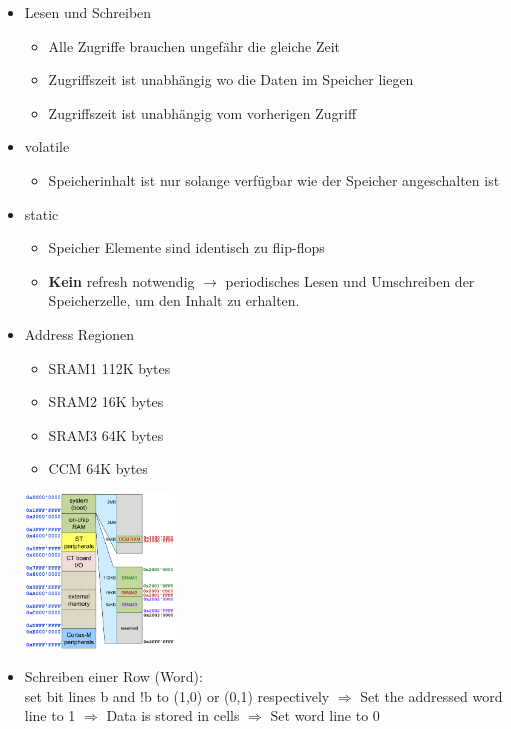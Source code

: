 \documentclass{article}
\newenvironment{Figure}
	{\par\medskip\noindent\minipage{\linewidth}}
	{\endminipage\par\medskip}
\begin{document}
\begin{itemize}
	\item{Lesen und Schreiben\\
	\begin{itemize}
		\item Alle Zugriffe brauchen ungefähr die gleiche Zeit
		\item Zugriffszeit ist unabhängig wo die Daten im Speicher liegen
		\item Zugriffszeit ist unabhängig vom vorherigen Zugriff
	\end{itemize}
	}
	\item {volatile
	\begin{itemize}
		\item Speicherinhalt ist nur solange verfügbar wie der Speicher angeschalten ist
	\end{itemize}		
	}
	\item {static
	\begin{itemize}
		\item Speicher Elemente sind identisch zu flip-flops
		\item \textbf{Kein} refresh notwendig $\rightarrow$ periodisches Lesen und Umschreiben der Speicherzelle, um den Inhalt zu erhalten.
	\end{itemize}
	}
	\item {Address Regionen
	\begin{itemize}
		\item SRAM1 112K bytes
		\item SRAM2 16K bytes
		\item SRAM3 64K bytes
		\item CCM 64K bytes
	\end{itemize}
	\begin{Figure}
	\includegraphics[width=150px]{img/AddressRegionenSRAM.png}
	\label{fig:Die Address Regionen eines SRAM Speichers}
	\end{Figure}		
	}
	\item {Schreiben einer Row (Word):\\
	set bit lines b and !b to (1,0) or (0,1) respectively $\Rightarrow$ Set the addressed word line to 1 $\Rightarrow$ Data is stored in cells $\Rightarrow$ Set word line to 0	
}
\end{itemize}
\end{document}
